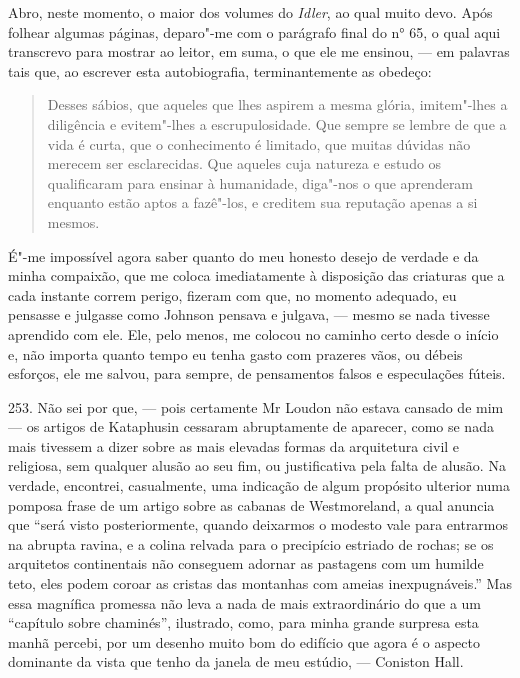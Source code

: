 Abro, neste momento, o maior dos volumes do \emph{Idler}, ao qual muito
devo. Após folhear algumas páginas, deparo"-me com o parágrafo final do
n° 65, o qual aqui transcrevo para mostrar ao leitor, em suma, o que ele
me ensinou, --- em palavras tais que, ao escrever esta autobiografia,
terminantemente as obedeço: %

\begin{quote}
Desses sábios, que aqueles que lhes aspirem a mesma glória,
imitem"-lhes a diligência e evitem"-lhes a escrupulosidade. Que sempre se
lembre de que a vida é curta, que o conhecimento é limitado, que muitas
dúvidas não merecem ser esclarecidas. Que aqueles cuja natureza e estudo
os qualificaram para ensinar à humanidade, diga"-nos o que aprenderam
enquanto estão aptos a fazê"-los, e creditem sua reputação apenas a si
mesmos.
\end{quote}

É"-me impossível agora saber quanto do meu honesto desejo de verdade e da
minha compaixão, que me coloca imediatamente à disposição das criaturas
que a cada instante correm perigo, fizeram com que, no momento adequado,
eu pensasse e julgasse como Johnson pensava e julgava, --- mesmo se nada
tivesse aprendido com ele. Ele, pelo menos, me colocou no caminho certo
desde o início e, não importa quanto tempo eu tenha gasto com prazeres
vãos, ou débeis esforços, ele me salvou, para sempre, de pensamentos
falsos e especulações fúteis.

253. Não sei por que, --- pois certamente Mr Loudon não estava cansado de
mim --- os artigos de Kataphusin cessaram abruptamente de aparecer, como
se nada mais tivessem a dizer sobre as mais elevadas formas da
arquitetura civil e religiosa, sem qualquer alusão ao seu fim, ou
justificativa pela falta de alusão. Na verdade, encontrei, casualmente,
uma indicação de algum propósito ulterior numa pomposa frase de um
artigo sobre as cabanas de Westmoreland, a qual anuncia que ``será visto
posteriormente, quando deixarmos o modesto vale para entrarmos na
abrupta ravina, e a colina relvada para o precipício estriado de rochas;
se os arquitetos continentais não conseguem adornar as pastagens com um
humilde teto, eles podem coroar as cristas das montanhas com ameias
inexpugnáveis.'' Mas essa magnífica promessa não leva a nada de mais
extraordinário do que a um ``capítulo sobre chaminés'', ilustrado, como,
para minha grande surpresa esta manhã percebi, por um desenho muito bom
do edifício que agora é o aspecto dominante da vista que tenho da janela
de meu estúdio, --- Coniston Hall.

